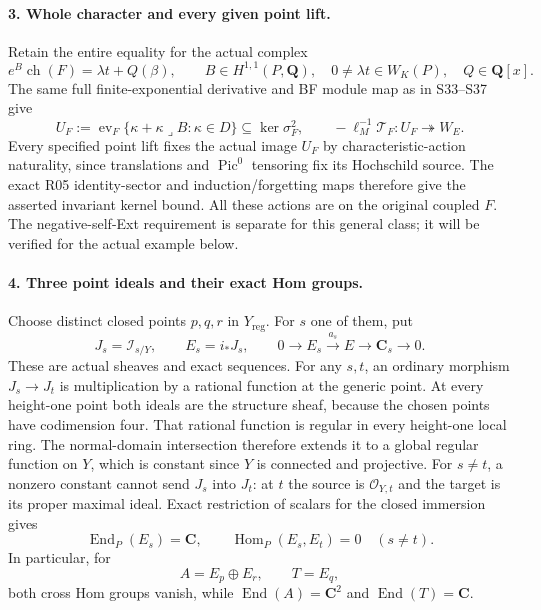 \paragraph{3. Whole character and every given point lift.}
Retain the entire equality for the actual complex
\[
 e^B\operatorname{ch}(F)=\lambda t+Q(\beta),\qquad
 B\in H^{1,1}(P,\mathbf Q),\quad
 0\ne\lambda t\in W_K(P),\quad Q\in\mathbf Q[x].
 \tag{F1S38.8}
\]
The same full finite-exponential derivative and BF module map
as in S33--S37 give
\[
 U_F:=\operatorname{ev}_F
   \{\kappa+\kappa\mathbin{\lrcorner}B:\kappa\in D\}
       \subseteq\ker\sigma_F^2,
 \qquad
 -\ell_M^{-1}\mathcal T_F:U_F\twoheadrightarrow W_E.
 \tag{F1S38.9}
\]
Every specified point lift fixes the actual image $U_F$ by
characteristic-action naturality, since translations and
$\operatorname{Pic}^0$ tensoring fix its Hochschild source.
The exact R05 identity-sector and induction/forgetting maps
therefore give the asserted invariant kernel bound. All these
actions are on the original coupled $F$.
The negative-self-Ext requirement is separate for this general
class; it will be verified for the actual example below.

\paragraph{4. Three point ideals and their exact Hom groups.}
Choose distinct closed points $p,q,r$ in $Y_{\mathrm{reg}}$.
For $s$ one of them, put
\[
 J_s=\mathcal I_{s/Y},\qquad E_s=i_*J_s,
 \qquad 0\longrightarrow E_s\xrightarrow{a_s}E
                    \longrightarrow\mathbf C_s\longrightarrow0.
 \tag{F1S38.10}
\]
These are actual sheaves and exact sequences. For any $s,t$,
an ordinary morphism $J_s\to J_t$ is multiplication by a
rational function at the generic point. At every height-one
point both ideals are the structure sheaf, because the chosen
points have codimension four. That rational function is regular
in every height-one local ring. The normal-domain intersection
therefore extends it to a global regular function on $Y$,
which is constant since $Y$ is connected and projective.
For $s\ne t$, a nonzero constant cannot send $J_s$ into $J_t$:
at $t$ the source is $\mathcal O_{Y,t}$ and the target is its
proper maximal ideal. Exact restriction of scalars for the
closed immersion gives
\[
 \operatorname{End}_P(E_s)=\mathbf C,
 \qquad \operatorname{Hom}_P(E_s,E_t)=0\quad(s\ne t).
 \tag{F1S38.11}
\]
In particular, for
\[
             A=E_p\oplus E_r,\qquad T=E_q,
 \tag{F1S38.12}
\]
both cross Hom groups vanish, while
$\operatorname{End}(A)=\mathbf C^2$ and
$\operatorname{End}(T)=\mathbf C$.

